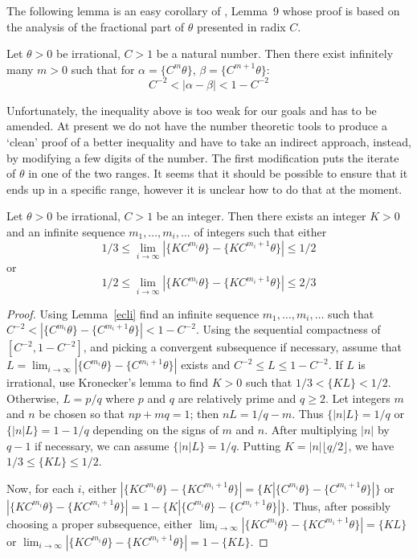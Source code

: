 \documentclass[12pt]{article}
\begin{document}
The following lemma is an easy corollary of \cite{Clinger},
Lemma~9 whose proof is based on the analysis of the fractional part of
$\theta$ presented in radix $C$.

\begin{lemma}\label{ecli}Let $\theta>0$ be irrational, $C>1$ be a
  natural number. Then there exist
  infinitely many $m>0$ such that for $\alpha=\{C^m\theta\}$,
  $\beta=\{C^{m+1}\theta\}$:
$$C^{-2}<|\alpha-\beta|<1-C^{-2}$$
\end{lemma}

Unfortunately, the inequality above is too weak for our goals and has
to be amended. At present we do not have the number theoretic tools to
produce a `clean' proof of a better inequality and have to take an
indirect approach, instead, by modifying a few digits of the number. The first
modification puts the iterate of $\theta$ in one of the two ranges. It
seems that it should be possible to ensure that it ends up in a
specific range, however it is unclear how to do that at the moment.
 
\begin{lemma}\label{qrational}
Let $\theta>0$ be irrational, $C>1$ be an integer. Then there exists
an integer $K>0$ and an infinite sequence $m_1,\ldots,m_i,\ldots$ of
integers such that either 
$$
1/3\leq\lim_{i\to\infty}|\{KC^{m_i}\theta\}-\{KC^{m_i+1}\theta\}|\leq1/2
$$ or
$$
1/2\leq\lim_{i\to\infty}|\{KC^{m_i}\theta\}-\{KC^{m_i+1}\theta\}|\leq2/3
$$
\end{lemma}
\begin{proof}
Using Lemma~\ref{ecli} find an infinite sequence $m_1,\ldots,m_i,\ldots$ such that
$C^{-2}<|\{C^{m_i}\theta\}-\{C^{m_i+1}\theta\}|<1-C^{-2}$. Using the
sequential compactness of $[C^{-2},1-C^{-2}]$, and picking a
convergent subsequence if necessary, assume that
$L=\lim_{i\to\infty}|\{C^{m_i}\theta\}-\{C^{m_i+1}\theta\}|$ exists
and $C^{-2}\leq L\leq 1-C^{-2}$. If $L$ is irrational, use Kronecker's
lemma to find $K>0$ such that $1/3<\{KL\}<1/2$. Otherwise, $L=p/q$
where $p$ and $q$ are relatively prime and $q\geq2$. Let integers $m$ and
$n$ be chosen so that $np+mq=1$; then $nL=1/q-m$. Thus
$\{|n|L\}=1/q$ or $\{|n|L\}=1-1/q$ depending on the signs of $m$ and
$n$. After multiplying $|n|$ by $q-1$ if necessary, we can assume
$\{|n|L\}=1/q$. Putting $K=|n|\lfloor q/2\rfloor$, we have
$1/3\leq\{KL\}\leq 1/2$. 

Now, for each $i$, either
$|\{KC^{m_i}\theta\}-\{KC^{m_i+1}\theta\}|=\{K|\{C^{m_i}\theta\}-\{C^{m_i+1}\theta\}|\}$
or
$|\{KC^{m_i}\theta\}-\{KC^{m_i+1}\theta\}|=1-\{K|\{C^{m_i}\theta\}-\{C^{m_i+1}\theta\}|\}$. Thus,
after possibly choosing a proper subsequence, either
$\lim_{i\to\infty}|\{KC^{m_i}\theta\}-\{KC^{m_i+1}\theta\}|=\{KL\}$ or
$\lim_{i\to\infty}|\{KC^{m_i}\theta\}-\{KC^{m_i+1}\theta\}|=1-\{KL\}$.
\end{proof}
\end{document}
